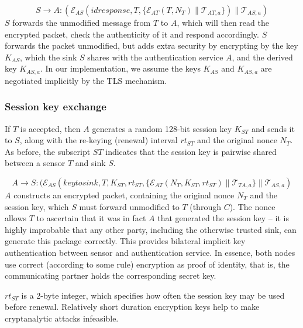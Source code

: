 \[
S \rightarrow A: (\mathcal{E}_{AS}(\textit{idresponse},T, \{
\mathcal{E}_{AT}(T,N_T) \parallel \mathcal{T}_{AT,a} \}) \parallel
\mathcal{T}_{AS,a})
\]
%
$S$ forwards the unmodified message from $T$ to $A$, which will then
read the encrypted packet, check the authenticity of it and respond
accordingly. $S$ forwards the packet unmodified, but adds extra security
by encrypting by the key $K_{AS}$, which the sink $S$ shares with the authentication service $A$, and the derived key
$K_{AS,a}$. In our implementation, we assume the keys $K_{AS}$ and $K_{AS,a}$ are negotiated implicitly by the TLS mechanism.

\subsubsection{Session key exchange}

If $T$ is accepted, then $A$ generates a random 128-bit session key $K_{ST}$ and
sends it to $S$, along with the re-keying (renewal) interval $rt_{ST}$ and the
original nonce $N_T$. As before, the subscript $ST$ indicates that the session key is pairwise shared between a sensor $T$ and sink $S$.

\[
A \rightarrow S: (\mathcal{E}_{AS}(\textit{keytosink},T,K_{ST},rt_{ST}, \{
\mathcal{E}_{AT}(N_T,K_{ST},rt_{ST}) \parallel \mathcal{T}_{TA,a}
\} \parallel \mathcal{T}_{AS,a})
\]
%
$A$ constructs an encrypted packet, containing the original nonce $N_T$ and the session key, 
which $S$ must forward unmodified to $T$ (through $C$). The nonce allows $T$ to ascertain that
it was in fact $A$ that generated the session key -- it is highly improbable that any other party,
including the otherwise trusted sink, can generate this package correctly. This provides bilateral implicit key authentication
\cite[pp. 498]{menezes1996} between sensor and authentication service. 
In essence, both nodes use correct (according to some rule) encryption as proof of identity, that is, the communicating partner holds the corresponding secret key.

%
$rt_{ST}$ is a 2-byte integer, which specifies how often the session key 
may be used before renewal. Relatively short duration encryption keys help to make cryptanalytic attacks infeasible.


